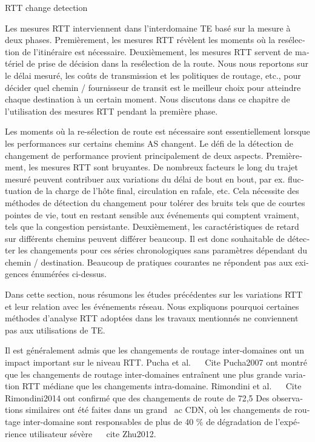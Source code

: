 \begin{otherlanguage}{french}
RTT change detection

Les mesures RTT interviennent dans l'interdomaine TE basé sur la mesure à deux phases.
Premièrement, les mesures RTT révèlent les moments où la resélection de l'itinéraire est nécessaire. %
Deuxièmement, les mesures RTT servent de matériel de prise de décision dans la resélection de la route. Nous nous reportons sur le délai mesuré, les coûts de transmission et les politiques de routage, etc., pour décider quel chemin / fournisseur de transit est le meilleur choix pour atteindre chaque destination à un certain moment.
Nous discutons dans ce chapitre de l'utilisation des mesures RTT pendant la première phase.

Les moments où la re-sélection de route est nécessaire sont essentiellement lorsque les performances sur certains chemins AS changent.
Le défi de la détection de changement de performance provient principalement de deux aspects.
Premièrement, les mesures RTT sont bruyantes.
De nombreux facteurs le long du trajet mesuré peuvent contribuer aux variations du délai de bout en bout, par ex. fluctuation de la charge de l'hôte final, circulation en rafale, etc.
Cela nécessite des méthodes de détection du changement pour tolérer des bruits tels que de courtes pointes de vie, tout en restant sensible aux événements qui comptent vraiment, tels que la congestion persistante.
Deuxièmement, les caractéristiques de retard sur différents chemins peuvent différer beaucoup.
Il est donc souhaitable de détecter les changements pour ces séries chronologiques sans paramètres dépendant du chemin / destination.
Beaucoup de pratiques courantes ne répondent pas aux exigences énumérées ci-dessus.

Dans cette section, nous résumons les études précédentes sur les variations RTT et leur relation avec les événements réseau.
Nous expliquons pourquoi certaines méthodes d'analyse RTT adoptées dans les travaux mentionnés ne conviennent pas aux utilisations de TE.

Il est généralement admis que les changements de routage inter-domaines ont un impact important sur le niveau RTT.
Pucha et al. ~ \ Cite {Pucha2007} ont montré que les changements de routage inter-domaines entraînent une plus grande variation RTT médiane que les changements intra-domaine.
Rimondini et al. ~ \ Cite {Rimondini2014} ont confirmé que des changements de route de 72,5%
Des observations similaires ont été faites dans un grand \ ac {CDN}, où les changements de routage inter-domaine sont responsables de plus de 40 $ \% $ de dégradation de l'expérience utilisateur sévère ~ \ cite {Zhu2012}.


\end{otherlanguage}

